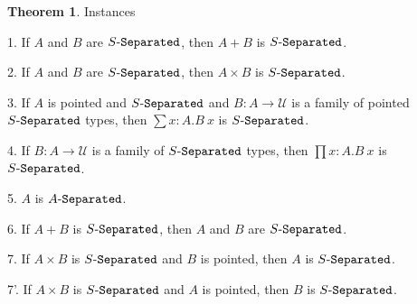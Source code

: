 \documentclass[11pt]{article}
\theoremstyle{definition}
\newtheorem{theorem}{Theorem}[section]
\renewcommand{\(}{\left(}
\renewcommand{\)}{\right)}
\newcommand{\U}{\mathcal{U}}
\newcommand{\apl}[2]{#1\ #2}
\newcommand{\dprod}[2]{\prod #1.#2}
\newcommand{\dsum}[2]{\sum #1.#2}
\newcommand{\prodt}[2]{#1 \times #2}
\begin{document}
\begin{theorem} Instances

1. If $A$ and $B$ are $\Separated{S}$, then $A + B$ is $\Separated{S}$.

2. If $A$ and $B$ are $\Separated{S}$, then $\prodt{A}{B}$ is $\Separated{S}$.

3. If $A$ is pointed and $\Separated{S}$ and $B : A \to \U$ is a family of pointed $\Separated{S}$ types, then $\dsum{x : A}{\apl{B}{x}}$ is $\Separated{S}$.

4. If $B : A \to \U$ is a family of $\Separated{S}$ types, then $\dprod{x : A}{\apl{B}{x}}$ is $\Separated{S}$.

5. $A$ is $\Separated{A}$.

6. If $A + B$ is $\Separated{S}$, then $A$ and $B$ are $\Separated{S}$.

7. If $\prodt{A}{B}$ is $\Separated{S}$ and $B$ is pointed, then $A$ is $\Separated{S}$.

7'. If $\prodt{A}{B}$ is $\Separated{S}$ and $A$ is pointed, then $B$ is $\Separated{S}$.

\end{theorem}
\end{document}
